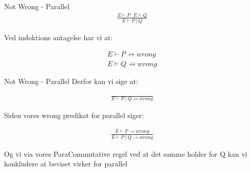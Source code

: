 \begin{frame}{Not Wrong - Parallel}
	\begin{align*}
		\frac{E \vdash P\ \ \ E \vdash Q}{E \vdash P\ |\ Q}
	\end{align*}

	Ved indoktions antagelse har vi at:

	\begin{align*}
		E \vdash P \nrightarrow wrong \\
		E \vdash Q \nrightarrow wrong
	\end{align*}
\end{frame}

\begin{frame}{Not Wrong - Parallel}
	Derfor kan vi sige at:

	\begin{align*}
		\frac{}{E \vdash P\ |\ Q \nrightarrow wrong}
	\end{align*}

	Siden vores wrong predikat for parallel siger:

	\begin{align*}
		\frac{E \vdash P \rightarrow wrong}{E \vdash P\ |\ Q \rightarrow wrong}
	\end{align*}

	Og vi via vores ParaCommutative regel ved at det samme holder for Q kan vi konkludere at beviset virker for parallel
\end{frame}
